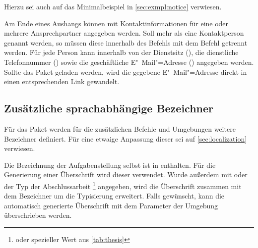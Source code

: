 \begin{Declaration*}{}
\begin{Example}
\begin{Code}[escapechar=§]
{  Bild (optional), einzubinden mit:
    \texttt{[image: §\\PName\{Datei]}§}
}{%
  \item Schwerpunkt 1
  \item Schwerpunkt 2
}
\end{Code}
Hierzu sei auch auf das Minimalbeispiel in \autoref{sec:exmpl:notice} verwiesen.
\end{Example}

\begin{Declaration}[v2.02]{}
\begin{Declaration}{}
\begin{Declaration}[v2.02]{}
\begin{Declaration}[v2.02]{}
\printdeclarationlist%
%
Am Ende eines Aushangs können mit  Kontaktinformationen 
für eine oder mehrere Ansprechpartner angegeben werden. Soll mehr als eine 
Kontaktperson genannt werden, so müssen diese innerhalb des Befehls
 mit dem Befehl  getrennt werden. Für jede 
Person kann innerhalb von  der Dienstsitz 
(), die dienstliche Telefonnummer () sowie die 
geschäftliche E"~Mail"=Adresse () angegeben werden. Sollte 
das Paket  geladen werden, wird die gegebene E"~Mail"=Adresse 
direkt in einen entsprechenden Link gewandelt.
\end{Declaration}
\end{Declaration}
\end{Declaration}
\end{Declaration}


\subsection{Zusätzliche sprachabhängige Bezeichner}
Für das Paket  werden für die zusätzlichen Befehle 
und Umgebungen weitere Bezeichner definiert. Für eine etwaige Anpassung dieser 
sei auf \autoref{sec:localization} verwiesen.

\begin{Declaration}{}
\begin{Declaration}{}
\printdeclarationlist%
%
Die Bezeichnung der Aufgabenstellung selbst ist in  enthalten. 
Für die Generierung einer Überschrift wird dieser verwendet. Wurde außerdem mit 
 oder  der Typ der Abschlussarbeit%
\footnote{%
   oder spezieller Wert aus \autoref{tab:thesis}
}
angegeben, wird die Überschrift zusammen mit dem Bezeichner 
um die Typisierung erweitert. Falls gewünscht, kann die automatisch generierte 
Überschrift mit dem Parameter  der Umgebung 
 überschrieben werden.
\end{Declaration}
\end{Declaration}


\end{Declaration*}
